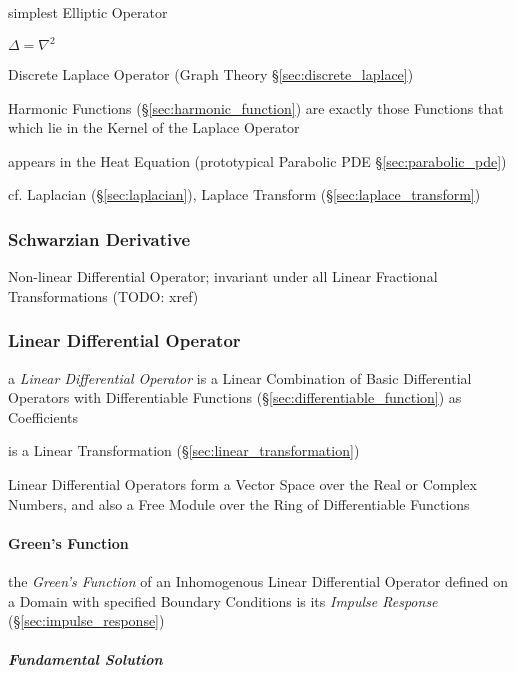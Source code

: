 simplest Elliptic Operator

$\Delta = \nabla^2$

Discrete Laplace Operator (Graph Theory \S\ref{sec:discrete_laplace})

Harmonic Functions (\S\ref{sec:harmonic_function}) are exactly those Functions
that which lie in the Kernel of the Laplace Operator

appears in the Heat Equation (prototypical Parabolic PDE
\S\ref{sec:parabolic_pde})

\fist cf. Laplacian (\S\ref{sec:laplacian}), Laplace Transform
(\S\ref{sec:laplace_transform})



\subsubsection{Schwarzian Derivative}\label{sec:schwarzian_derivative}

Non-linear Differential Operator; invariant under all Linear Fractional
Transformations (TODO: xref)



\subsubsection{Linear Differential Operator}
\label{sec:linear_differential_operator}

a \emph{Linear Differential Operator} is a Linear Combination of Basic
Differential Operators with Differentiable Functions
(\S\ref{sec:differentiable_function}) as Coefficients

is a Linear Transformation (\S\ref{sec:linear_transformation})

Linear Differential Operators form a Vector Space over the Real or Complex
Numbers, and also a Free Module over the Ring of Differentiable Functions



\paragraph{Green's Function}\label{sec:greens_function}\hfill

the \emph{Green's Function} of an Inhomogenous Linear Differential Operator
defined on a Domain with specified Boundary Conditions is its \emph{Impulse
  Response} (\S\ref{sec:impulse_response})



\subparagraph{Fundamental Solution}\label{sec:fundamental_solution}\hfill

